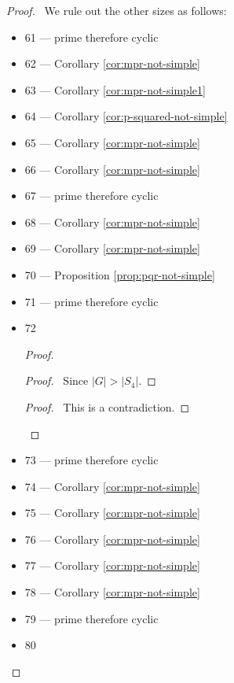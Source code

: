\begin{proof}
\pf\ We rule out the other sizes as follows:
\begin{itemize}
\item 61 --- prime therefore cyclic
\item 62 --- Corollary \ref{cor:mpr-not-simple}
\item 63 --- Corollary \ref{cor:mpr-not-simple1}
\item 64 --- Corollary \ref{cor:p-squared-not-simple}
\item 65 --- Corollary \ref{cor:mpr-not-simple}
\item 66 --- Corollary \ref{cor:mpr-not-simple}
\item 67 --- prime therefore cyclic
\item 68 --- Corollary \ref{cor:mpr-not-simple}
\item 69 --- Corollary \ref{cor:mpr-not-simple}
\item 70 --- Proposition \ref{prop:pqr-not-simple}
\item 71 --- prime therefore cyclic
\item 72
\begin{proof}
	\pf
	\begin{proof}
		\pf\ Since $|G| > |S_4|$.
	\end{proof}
	\qedstep
	\begin{proof}
		\pf\ This is a contradiction.
	\end{proof}
\end{proof}
\item 73 --- prime therefore cyclic
\item 74 --- Corollary \ref{cor:mpr-not-simple}
\item 75 --- Corollary \ref{cor:mpr-not-simple}
\item 76 --- Corollary \ref{cor:mpr-not-simple}
\item 77 --- Corollary \ref{cor:mpr-not-simple}
\item 78 --- Corollary \ref{cor:mpr-not-simple}
\item 79 --- prime therefore cyclic
\item 80

\end{itemize}
\end{proof}
